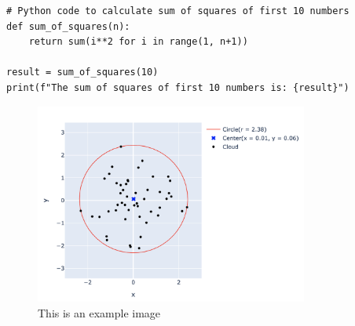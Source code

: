 \documentclass{article}  %
\begin{document}
\begin{lstlisting}
# Python code to calculate sum of squares of first 10 numbers
def sum_of_squares(n):
    return sum(i**2 for i in range(1, n+1))

result = sum_of_squares(10)
print(f"The sum of squares of first 10 numbers is: {result}")
\end{lstlisting}

\begin{figure}[h]
\centering
\includegraphics[width=0.8\textwidth]{graph.png}
\caption{This is an example image}\label{fig:example}
\end{figure}

\end{document}
